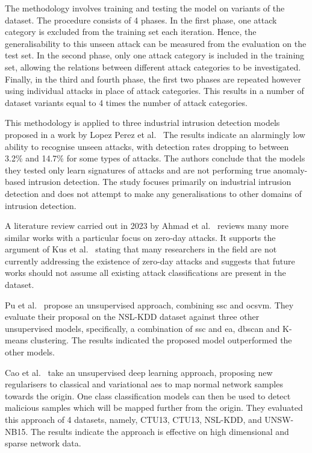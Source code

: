 The methodology involves training and testing the model on variants of the
dataset. The procedure consists of 4 phases. In the first phase, one attack
category is excluded from the training set each iteration. Hence, the
generalisability to this unseen attack can be measured from the evaluation on
the test set. In the second phase, only one attack category is included in the
training set, allowing the relations between different attack categories to be
investigated. Finally, in the third and fourth phase, the first two phases are
repeated however using individual attacks in place of attack categories. This
results in a number of dataset variants equal to 4 times the number of attack
categories.

This methodology is applied to three industrial intrusion detection models
proposed in a work by Lopez Perez et al.~\cite{Perez} The results indicate an
alarmingly low ability to recognise unseen attacks, with detection rates
dropping to between 3.2\% and 14.7\% for some types of attacks. The authors
conclude that the models they tested only learn signatures of attacks and are
not performing true anomaly-based intrusion detection. The study focuses
primarily on industrial intrusion detection and does not attempt to make any
generalisations to other domains of intrusion detection.

A literature review carried out in 2023 by Ahmad et al.~\cite{zero-day} reviews
many more similar works with a particular focus on zero-day attacks. It
supports the argument of Kus et al.~\cite{Kus} stating that many researchers in
the field are not currently addressing the existence of zero-day attacks and
suggests that future works should not assume all existing attack
classifications are present in the dataset.

Pu et al.~\cite{} propose an unsupervised approach, combining \gls{ssc} and
\gls{ocsvm}. They evaluate their proposal on the NSL-KDD dataset against three
other unsupervised models, specifically, a combination of \gls{ssc} and
\gls{ea}, \gls{dbscan} and K-means clustering. The results indicated the
proposed model outperformed the other models.

Cao et al.~\cite{} take an unsupervised deep learning approach, proposing new
regularisers to classical and variational \gls{ae}s to map normal network
samples towards the origin. One class classification models can then be used to
detect malicious samples which will be mapped further from the origin. They
evaluated this approach of 4 datasets, namely, CTU13, CTU13, NSL-KDD,
and UNSW-NB15. The results indicate the approach is effective on high
dimensional and sparse network data.

